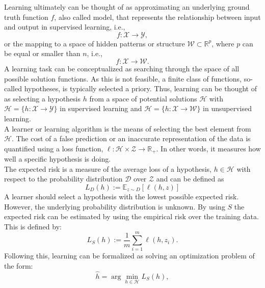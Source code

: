 \begin{tcolorbox}
    Learning ultimately can be thought of as approximating an underlying ground truth function $f$, also called model, that represents the relationship between input and output in supervised learning, i.e., 
    \begin{equation}
    f:\mathcal{X}\rightarrow\mathcal{Y},
    \end{equation}
    or the mapping to a space of hidden patterns or structure $\mathcal{W}\subset\mathbb{R}^p$, where $p$ can be equal or smaller than $n$, i.e.,
    \begin{equation}
    f:\mathcal{X}\rightarrow\mathcal{W}.
    \end{equation}
    A learning task can be conceptualized as searching through the space of all possible solution functions. As this is not feasible, a finite class of functions, so-called hypotheses, is typically selected a priory. Thus, learning can be thought of as selecting a hypothesis $h$ from a space of potential solutions $\mathcal{H}$ with $\mathcal{H}=\{h:\mathcal{X}\rightarrow\mathcal{Y}\}$ in supervised learning and $\mathcal{H}=\{h:\mathcal{X}\rightarrow\mathcal{W}\}$ in unsupervised learning. \\
    A learner or learning algorithm is the means of selecting the best element from $\mathcal{H}$.
    The cost of a false prediction or an inaccurate representation of the data is quantified using a loss function, $\ell:\mathcal{H}\times\mathcal{Z}\rightarrow\mathbb{R}_+$. In other words, it measures how well a specific hypothesis is doing.\\
    The expected risk is a measure of the average loss of a hypothesis, $h\in\mathcal{H}$ with respect to the probability distribution $\mathcal{D}$ over $\mathcal{Z}$ and can be defined as
    \begin{equation}
    L_{D}(h):=\mathbb{E}_{z\sim D}[\ell(h,z)]
    \end{equation}
    A learner should select a hypothesis with the lowest possible expected risk. However, the underlying probability distribution is unknown. By using $S$ the expected risk can be estimated by using the empirical risk over the training data. This is defined by:
    \begin{equation}
    L_{S}(h):=\frac{1}{m}\sum_{i=1}^m\ell(h,z_i).
    \end{equation}
    Following this, learning can be formalized as solving an optimization problem of the form: 
    \begin{equation}
    \hat{h}=\arg\min_{h\in\mathcal{H}}L_{S}(h),
    \end{equation}

\end{tcolorbox}
